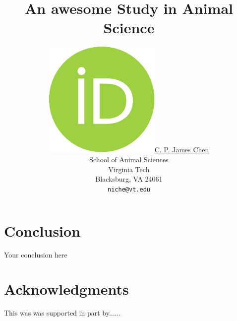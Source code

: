 \documentclass{article}
\title{An awesome Study in Animal Science}
\author{
	\href{https://orcid.org/0000-0000-0000-0000}{\includegraphics[scale=0.06]{orcid.pdf}\hspace{1mm}C. P. James Chen} \\
	School of Animal Sciences\\
	Virginia Tech\\
	Blacksburg, VA 24061 \\
	\texttt{niche@vt.edu}
}
\begin{document}
\maketitle



% 
% 
% 



\section{Conclusion}
Your conclusion here

\section*{Acknowledgments}
This was was supported in part by......




\newpage

\end{document}
